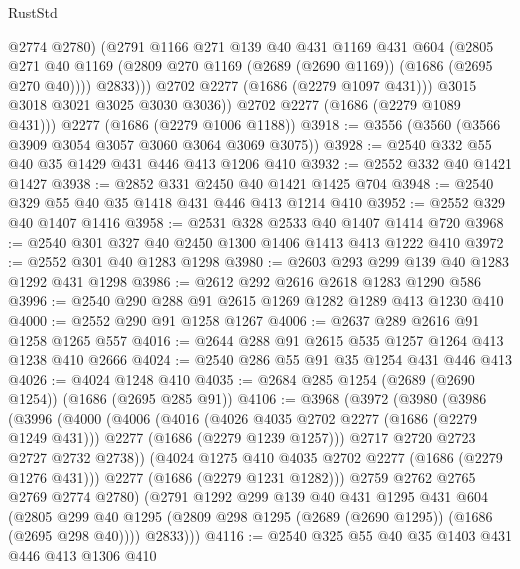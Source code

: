 \begin{lexlean}{RustStd}
\begin{coremodule}
                  @2774
                  @2780)
                (@2791
                  @1166
                  @271
                  @139
                  @40
                  @431
                  @1169
                  @431
                  @604
                  (@2805
                    @271
                    @40
                    @1169
                    (@2809 @270 @1169 (@2689 (@2690 @1169)) (@1686 (@2695 @270 @40))))
                  @2833)))
            @2702
            @2277
            (@1686 (@2279 @1097 @431)))
          @3015
          @3018
          @3021
          @3025
          @3030
          @3036))
      @2702
      @2277
      (@1686 (@2279 @1089 @431)))
    @2277
    (@1686 (@2279 @1006 @1188))
@3918 := @3556 (@3560 (@3566 @3909 @3054 @3057 @3060 @3064 @3069 @3075))
@3928 := @2540 @332 @55 @40 @35 @1429 @431 @446 @413 @1206 @410
@3932 := @2552 @332 @40 @1421 @1427
@3938 := @2852 @331 @2450 @40 @1421 @1425 @704
@3948 := @2540 @329 @55 @40 @35 @1418 @431 @446 @413 @1214 @410
@3952 := @2552 @329 @40 @1407 @1416
@3958 := @2531 @328 @2533 @40 @1407 @1414 @720
@3968 := @2540 @301 @327 @40 @2450 @1300 @1406 @1413 @413 @1222 @410
@3972 := @2552 @301 @40 @1283 @1298
@3980 := @2603 @293 @299 @139 @40 @1283 @1292 @431 @1298
@3986 := @2612 @292 @2616 @2618 @1283 @1290 @586
@3996 := @2540 @290 @288 @91 @2615 @1269 @1282 @1289 @413 @1230 @410
@4000 := @2552 @290 @91 @1258 @1267
@4006 := @2637 @289 @2616 @91 @1258 @1265 @557
@4016 := @2644 @288 @91 @2615 @535 @1257 @1264 @413 @1238 @410 @2666
@4024 := @2540 @286 @55 @91 @35 @1254 @431 @446 @413
@4026 := @4024 @1248 @410
@4035 := @2684 @285 @1254 (@2689 (@2690 @1254)) (@1686 (@2695 @285 @91))
@4106 := @3968
    (@3972
      (@3980
        (@3986
          (@3996
            (@4000
              (@4006
                (@4016
                  (@4026 @4035 @2702 @2277 (@1686 (@2279 @1249 @431)))
                  @2277
                  (@1686 (@2279 @1239 @1257)))
                @2717
                @2720
                @2723
                @2727
                @2732
                @2738))
            (@4024 @1275 @410 @4035 @2702 @2277 (@1686 (@2279 @1276 @431)))
            @2277
            (@1686 (@2279 @1231 @1282)))
          @2759
          @2762
          @2765
          @2769
          @2774
          @2780)
        (@2791
          @1292
          @299
          @139
          @40
          @431
          @1295
          @431
          @604
          (@2805 @299 @40 @1295 (@2809 @298 @1295 (@2689 (@2690 @1295)) (@1686 (@2695 @298 @40))))
          @2833)))
@4116 := @2540 @325 @55 @40 @35 @1403 @431 @446 @413 @1306 @410

\end{coremodule}
\end{lexlean}

